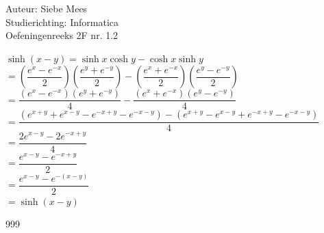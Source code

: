 \documentclass[a4paper]{article}
\begin{document}
  
\noindent \large Auteur: Siebe Mees \\
\noindent \large Studierichting: Informatica\\
\noindent \large Oefeningenreeks 2F nr. 1.2\\

\medskip

\normalsize

$ \sinh(x-y)=\sinh x \cosh y-\cosh x \sinh y $\\

$ =\left(\dfrac{e^x-e^{-x}}{2}\right)\left(\dfrac{e^y+e^{-y}}{2}\right)-\left(\dfrac{e^x+e^{-x}}{2}\right)\left(\dfrac{e^y-e^{-y}}{2}\right) $\\

$ =\dfrac{(e^x-e^{-x})(e^y+e^{-y})}{4}-\dfrac{(e^x+e^{-x})(e^y-e^{-y})}{4} $\\

$ =\dfrac{(e^{x+y}+e^{x-y}-e^{-x+y}-e^{-x-y})-(e^{x+y}-e^{x-y}+e^{-x+y}-e^{-x-y})}{4} $\\

$ =\dfrac{2e^{x-y}-2e^{-x+y}}{4} $\\

$ =\dfrac{e^{x-y}-e^{-x+y}}{2} $\\

$ =\dfrac{e^{x-y}-e^{-(x-y)}}{2} $\\

$ =\sinh(x-y) $\\

\begin{thebibliography}{999}
\end{thebibliography}
\end{document}
